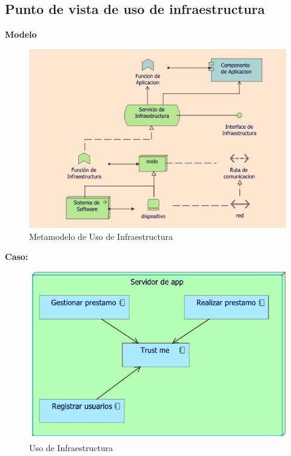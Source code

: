 	\subsection{Punto de vista de uso de infraestructura}
	{
		
		\textbf{Modelo}\\
		\begin{figure}[H]
			\centering
			\includegraphics[width=0.8\linewidth]{development/usoinfraestructura.png}
			\caption{Metamodelo de Uso de Infraestructura}
		\end{figure}
		
		\textbf{Caso:} 
		
		\begin{figure}[H]
			\centering
			\includegraphics[width=0.8\linewidth]{development/usoinfraestructura.pdf}
			\caption{Uso de Infraestructura}
		\end{figure}
	}
	
